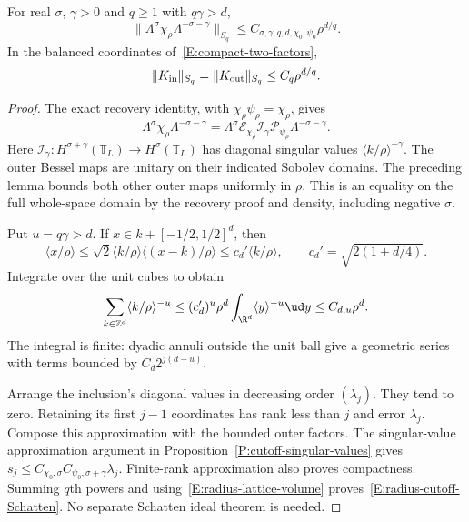 \begin{proposition}
  \label{P:radius-compact-envelopes}
  For real $\sigma$, $\gamma>0$ and $q\ge1$ with $q\gamma>d$,
  \begin{equation}\label{E:radius-cutoff-Schatten}
    \|\Lambda^\sigma\chi_\rho\Lambda^{-\sigma-\gamma}\|_{S_q}
    \le C_{\sigma,\gamma,q,d,\chi_0,\psi_0}\rho^{d/q}.
  \end{equation}
  In the balanced coordinates of~\eqref{E:compact-two-factors},
  \begin{equation}\label{E:radius-two-envelopes}
    \|K_{\rm in}\|_{S_q}=\|K_{\rm out}\|_{S_q}
    \le C_q\rho^{d/q}.
  \end{equation}
\end{proposition}

\begin{proof}
  The exact recovery identity, with $\chi_\rho\psi_\rho=\chi_\rho$,
  gives
  \[
    \Lambda^\sigma\chi_\rho\Lambda^{-\sigma-\gamma}
    =\Lambda^\sigma\mathcal E_{\chi_\rho}\mathcal I_\gamma
    \mathcal P_{\psi_\rho}\Lambda^{-\sigma-\gamma}.
  \]
  Here $\mathcal I_\gamma:H^{\sigma+\gamma}(\mathbb T_L)
  \to H^\sigma(\mathbb T_L)$ has diagonal singular values
  $\langle k/\rho\rangle^{-\gamma}$.
  The outer Bessel maps are unitary on their indicated Sobolev
  domains. The preceding lemma bounds both other outer maps
  uniformly in $\rho$.
  This is an equality on the full whole-space domain by the
  recovery proof and density, including negative $\sigma$.

  Put $u=q\gamma>d$. If $x\in k+[-1/2,1/2]^d$, then
  \[
    \langle x/\rho\rangle
    \le\sqrt2\langle k/\rho\rangle\langle(x-k)/\rho\rangle
    \le c_d'\langle k/\rho\rangle,\qquad
    c_d'=\sqrt{2(1+d/4)}.
  \]
  Integrate over the unit cubes to obtain
  \begin{equation}\label{E:radius-lattice-volume}
    \sum_{k\in\mathbb Z^d}\langle k/\rho\rangle^{-u}
    \le(c_d')^u\rho^d\int_{\R^d}\langle y\rangle^{-u}\ud y
    \le C_{d,u}\rho^d .
  \end{equation}
  The integral is finite: dyadic annuli outside the unit ball
  give a geometric series with terms bounded by $C_d2^{j(d-u)}$.

  Arrange the inclusion's diagonal values in decreasing order
  $(\lambda_j)$. They tend to zero. Retaining its first $j-1$
  coordinates has rank less than $j$ and error $\lambda_j$.
  Compose this approximation with the bounded outer factors.
  The singular-value approximation argument in
  Proposition~\ref{P:cutoff-singular-values} gives
  $s_j\le C_{\chi_0,\sigma}C_{\psi_0,\sigma+\gamma}\lambda_j$.
  Finite-rank approximation also proves compactness.
  Summing $q$th powers and using~\eqref{E:radius-lattice-volume}
  proves~\eqref{E:radius-cutoff-Schatten}.
  No separate Schatten ideal theorem is needed.


\end{proof}
